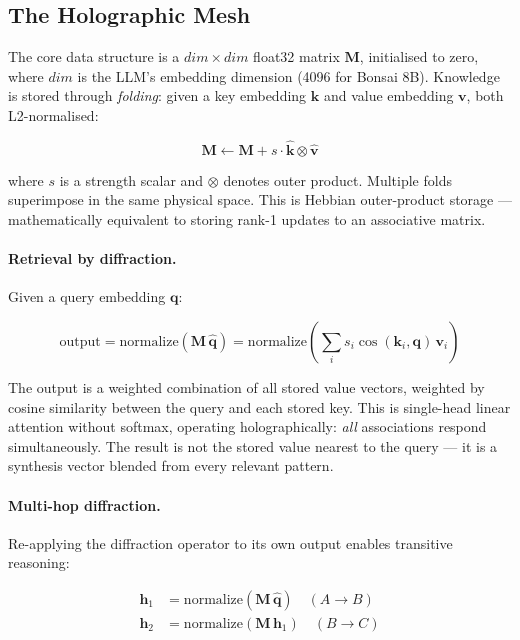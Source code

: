 \documentclass[11pt]{article}
\begin{document}
\subsection{The Holographic Mesh}

The core data structure is a $\mathit{dim} \times \mathit{dim}$ float32 matrix
$\mathbf{M}$, initialised to zero, where $\mathit{dim}$ is the LLM's embedding
dimension (4096 for Bonsai 8B). Knowledge is stored through \emph{folding}:
given a key embedding $\mathbf{k}$ and value embedding $\mathbf{v}$, both
L2-normalised:

\begin{equation}
  \mathbf{M} \leftarrow \mathbf{M} + s \cdot \hat{\mathbf{k}} \otimes \hat{\mathbf{v}}
\end{equation}

where $s$ is a strength scalar and $\otimes$ denotes outer product. Multiple
folds superimpose in the same physical space. This is Hebbian outer-product
storage --- mathematically equivalent to storing rank-1 updates to an
associative matrix.

\paragraph{Retrieval by diffraction.}
Given a query embedding $\mathbf{q}$:

\begin{equation}
  \text{output} = \text{normalize}(\mathbf{M}\,\hat{\mathbf{q}})
  = \text{normalize}\!\left(\sum_i s_i \cos(\mathbf{k}_i, \mathbf{q})\,\mathbf{v}_i\right)
\end{equation}

The output is a weighted combination of all stored value vectors, weighted by
cosine similarity between the query and each stored key. This is single-head
linear attention without softmax, operating holographically: \emph{all}
associations respond simultaneously. The result is not the stored value nearest
to the query --- it is a synthesis vector blended from every relevant pattern.

\paragraph{Multi-hop diffraction.}
Re-applying the diffraction operator to its own output enables transitive
reasoning:

\begin{align}
  \mathbf{h}_1 &= \text{normalize}(\mathbf{M}\,\hat{\mathbf{q}}) \quad (A \to B) \\
  \mathbf{h}_2 &= \text{normalize}(\mathbf{M}\,\mathbf{h}_1) \quad (B \to C)
\end{align}
\end{document}
